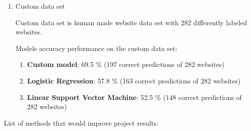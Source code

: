 \begin{enumerate}
\begin{enumerate}
    \end{enumerate}
    \item Custom data set
    
    Custom data set is human made website data set with 282 differently labeled websites. 
    
    Models accuracy performance on the custom data set:
    
    \begin{enumerate}
        \item \textbf{Custom model}: 69.5 \% (197 correct predictions of 282 websites)
        \item \textbf{Logistic Regression}: 57.8 \% (163 correct predictions of 282 websites)
        \item \textbf{Linear Support Vector Machine}: 52.5 \% (148 correct predictions of 282 websites)
    \end{enumerate}
\end{enumerate}

List of methods that would improve project results:

